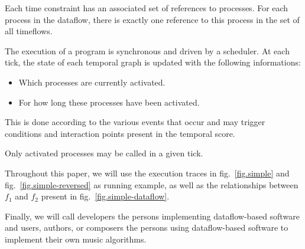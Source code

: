 \documentclass{article}
\begin{document}
Each time constraint has an associated set of references to processes.
For each process in the dataflow, there is exactly one reference to this process in the set of all timeflows.
    
The execution of a program is synchronous and driven by a scheduler.
At each tick, the state of each temporal graph is updated with the following informations:
    
\begin{itemize}
  \item Which processes are currently activated.
  \item For how long these processes have been activated.
\end{itemize}

This is done according to the various events that occur and may trigger conditions and interaction points present in the temporal score.
    
Only activated processes may be called in a given tick.
    
    

    
Throughout this paper, we will use the execution traces in fig.~\ref{fig.simple} and fig.~\ref{fig.simple-reversed} as running example, as well as the relationships between $f_1$ and $f_2$ present in fig.~\ref{fig.simple-dataflow}. 
    
Finally, we will call developers the persons implementing dataflow-based software and users, authors, or composers the persons using dataflow-based software to implement their own music algorithms.
\end{document}
